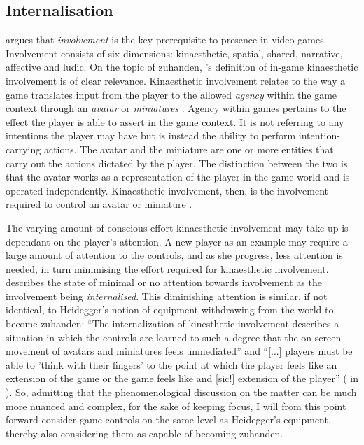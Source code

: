\subsection{Internalisation}
 argues that \textit{involvement} is the key prerequisite to presence in video games. Involvement consists of six dimensions: kinaesthetic, spatial, shared, narrative, affective and ludic. On the topic of zuhanden, \citeauthor{calleja}'s \citeyear{calleja} definition of in-game kinaesthetic involvement is of clear relevance. Kinaesthetic involvement relates to the way a game translates input from the player to the allowed \textit{agency} within the game context through an \textit{avatar} or \textit{miniatures} \cite{calleja}. Agency within games pertains to the effect the player is able to assert in the game context. It is not referring to any intentions the player may have but is instead the ability to perform intention-carrying actions. The avatar and the miniature are one or more entities that carry out the actions dictated by the player. The distinction between the two is that the avatar works as a representation of the player in the game world and is operated independently. Kinaesthetic involvement, then, is the involvement required to control an avatar or miniature \cite{calleja}.

The varying amount of conscious effort kinaesthetic involvement may take up is dependant on the player's attention. A new player as an example may require a large amount of attention to the controls, and as she progress, less attention is needed, in turn minimising the effort required for kinaesthetic involvement.  describes the state of minimal or no attention towards involvement as the involvement being \textit{internalised}. This diminishing attention is similar, if not identical, to Heidegger's notion of equipment withdrawing from the world to become zuhanden: ``The internalization of kinesthetic involvement describes a situation in which the controls are learned to such a degree that the on-screen movement of avatars and miniatures feels unmediated'' \cite[p. 68]{calleja} and ``[...] players must be able to 'think with their fingers' to the point at which the player feels like an extension of the game or the game feels like and [sic!] extension of the player'' ( in ). So, admitting that the phenomenological discussion on the matter can be much more nuanced and complex, for the sake of keeping focus, I will from this point forward consider game controls on the same level as Heidegger's equipment, thereby also considering them as capable of becoming zuhanden.

